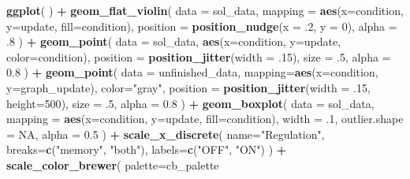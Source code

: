 \documentclass[]{book}
\newenvironment{Shaded}{\begin{snugshade}}{\end{snugshade}}
\newcommand{\DataTypeTok}[1]{\textcolor[rgb]{0.13,0.29,0.53}{#1}}
\newcommand{\DecValTok}[1]{\textcolor[rgb]{0.00,0.00,0.81}{#1}}
\newcommand{\FloatTok}[1]{\textcolor[rgb]{0.00,0.00,0.81}{#1}}
\newcommand{\KeywordTok}[1]{\textcolor[rgb]{0.13,0.29,0.53}{\textbf{#1}}}
\newcommand{\NormalTok}[1]{#1}
\newcommand{\OperatorTok}[1]{\textcolor[rgb]{0.81,0.36,0.00}{\textbf{#1}}}
\newcommand{\OtherTok}[1]{\textcolor[rgb]{0.56,0.35,0.01}{#1}}
\newcommand{\StringTok}[1]{\textcolor[rgb]{0.31,0.60,0.02}{#1}}
\begin{document}
\begin{Shaded}
\begin{Highlighting}[]
\KeywordTok{ggplot}\NormalTok{( ) }\OperatorTok{+}
\StringTok{  }\KeywordTok{geom_flat_violin}\NormalTok{(}
    \DataTypeTok{data =}\NormalTok{ sol_data,}
    \DataTypeTok{mapping =} \KeywordTok{aes}\NormalTok{(}\DataTypeTok{x=}\NormalTok{condition, }\DataTypeTok{y=}\NormalTok{update, }\DataTypeTok{fill=}\NormalTok{condition),}
    \DataTypeTok{position =} \KeywordTok{position_nudge}\NormalTok{(}\DataTypeTok{x =} \FloatTok{.2}\NormalTok{, }\DataTypeTok{y =} \DecValTok{0}\NormalTok{),}
    \DataTypeTok{alpha =} \FloatTok{.8}
\NormalTok{  ) }\OperatorTok{+}
\StringTok{  }\KeywordTok{geom_point}\NormalTok{(}
    \DataTypeTok{data =}\NormalTok{ sol_data,}
    \KeywordTok{aes}\NormalTok{(}\DataTypeTok{x=}\NormalTok{condition, }\DataTypeTok{y=}\NormalTok{update, }\DataTypeTok{color=}\NormalTok{condition),}
    \DataTypeTok{position =} \KeywordTok{position_jitter}\NormalTok{(}\DataTypeTok{width =} \FloatTok{.15}\NormalTok{),}
    \DataTypeTok{size =} \FloatTok{.5}\NormalTok{,}
    \DataTypeTok{alpha =} \FloatTok{0.8}
\NormalTok{  ) }\OperatorTok{+}
\StringTok{  }\KeywordTok{geom_point}\NormalTok{(}
    \DataTypeTok{data =}\NormalTok{ unfinished_data,}
    \DataTypeTok{mapping=}\KeywordTok{aes}\NormalTok{(}\DataTypeTok{x=}\NormalTok{condition, }\DataTypeTok{y=}\NormalTok{graph_update),}
    \DataTypeTok{color=}\StringTok{"gray"}\NormalTok{,}
    \DataTypeTok{position =} \KeywordTok{position_jitter}\NormalTok{(}\DataTypeTok{width =} \FloatTok{.15}\NormalTok{, }\DataTypeTok{height=}\DecValTok{500}\NormalTok{),}
    \DataTypeTok{size =} \FloatTok{.5}\NormalTok{,}
    \DataTypeTok{alpha =} \FloatTok{0.8}
\NormalTok{  ) }\OperatorTok{+}
\StringTok{  }\KeywordTok{geom_boxplot}\NormalTok{(}
    \DataTypeTok{data =}\NormalTok{ sol_data,}
    \DataTypeTok{mapping =} \KeywordTok{aes}\NormalTok{(}\DataTypeTok{x=}\NormalTok{condition, }\DataTypeTok{y=}\NormalTok{update, }\DataTypeTok{fill=}\NormalTok{condition),}
    \DataTypeTok{width =} \FloatTok{.1}\NormalTok{,}
    \DataTypeTok{outlier.shape =} \OtherTok{NA}\NormalTok{,}
    \DataTypeTok{alpha =} \FloatTok{0.5}
\NormalTok{  ) }\OperatorTok{+}
\StringTok{  }\KeywordTok{scale_x_discrete}\NormalTok{(}
    \DataTypeTok{name=}\StringTok{"Regulation"}\NormalTok{,}
    \DataTypeTok{breaks=}\KeywordTok{c}\NormalTok{(}\StringTok{"memory"}\NormalTok{, }\StringTok{"both"}\NormalTok{),}
    \DataTypeTok{labels=}\KeywordTok{c}\NormalTok{(}\StringTok{"OFF"}\NormalTok{, }\StringTok{"ON"}\NormalTok{)}
\NormalTok{  ) }\OperatorTok{+}
\StringTok{  }\KeywordTok{scale_color_brewer}\NormalTok{(}
    \DataTypeTok{palette=}\NormalTok{cb_palette}

\end{Highlighting}
\end{Shaded}
\end{document}
